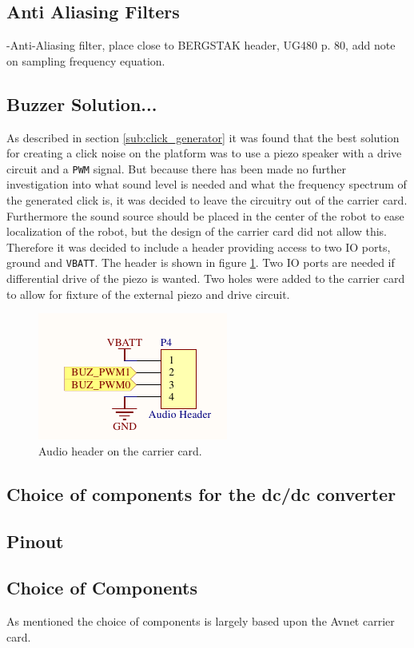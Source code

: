 \subsection{Anti Aliasing Filters}
-Anti-Aliasing filter, place close to BERGSTAK header, UG480 p. 80, add note on sampling frequency equation.

\subsection{Buzzer Solution...}
As described in section \ref{sub:click_generator} it was found that the best solution for creating a click noise on the platform was to use a piezo speaker with a drive circuit and a \texttt{PWM} signal.
But because there has been made no further investigation into what sound level is needed and what the frequency spectrum of the generated click is, it was decided to leave the circuitry out of the carrier card.
Furthermore the sound source should be placed in the center of the robot to ease localization of the robot, but the design of the carrier card did not allow this.
Therefore it was decided to include a header providing access to two IO ports, ground and \texttt{VBATT}.
The header is shown in figure \ref{fig:audio_header}.
Two IO ports are needed if differential drive of the piezo is wanted.
Two holes were added to the carrier card to allow for fixture of the external piezo and drive circuit.

\begin{figure}
	\centering
	\includegraphics[width=0.4\linewidth]{graphics/audio_header.pdf}
	\caption{Audio header on the carrier card.}
	\label{fig:audio_header}
\end{figure}



\subsection{Choice of components for the dc/dc converter}

\subsection{Pinout}

\subsection{Choice of Components}
As mentioned the choice of components is largely based upon the Avnet carrier card.
